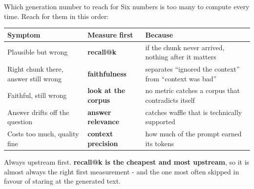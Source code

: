 \documentclass[aspectratio=169]{beamer}
\newcommand{\takebox}[1]{%
  \begin{tcolorbox}[colback=paramgreen!8, colframe=paramgreen, boxrule=0.6pt, arc=2pt]
  #1
  \end{tcolorbox}}
\begin{document}
\begin{frame}{Which generation number to reach for}
  \vspace{0.15em}
  {\small Six numbers is too many to compute every time. Reach for them in this order:}

  \vspace{0.2em}
  \begin{center}
  \footnotesize
  \begin{tabular}{p{}p{}p{}}
    \toprule
    \textbf{Symptom} & \textbf{Measure first} & \textbf{Because} \\
    \midrule
    Plausible but wrong &
    \textbf{recall@k} &
    if the chunk never arrived, nothing after it matters \\[0.1em]
    Right chunk there, answer still wrong &
    \textbf{faithfulness} &
    separates ``ignored the context'' from ``context was bad'' \\[0.1em]
    Faithful, still wrong &
    \textbf{look at the corpus} &
    no metric catches a corpus that contradicts itself \\[0.1em]
    Answer drifts off the question &
    \textbf{answer relevance} &
    catches waffle that is technically supported \\[0.1em]
    Costs too much, quality fine &
    \textbf{context precision} &
    how much of the prompt earned its tokens \\
    \bottomrule
  \end{tabular}
  \end{center}

  \vspace{0.25em}
  \takebox{\scriptsize Always upstream first. \textbf{recall@k is the cheapest and most
  upstream}, so it is almost always the right first measurement - and the one most often
  skipped in favour of staring at the generated text.}
\end{frame}
\end{document}
